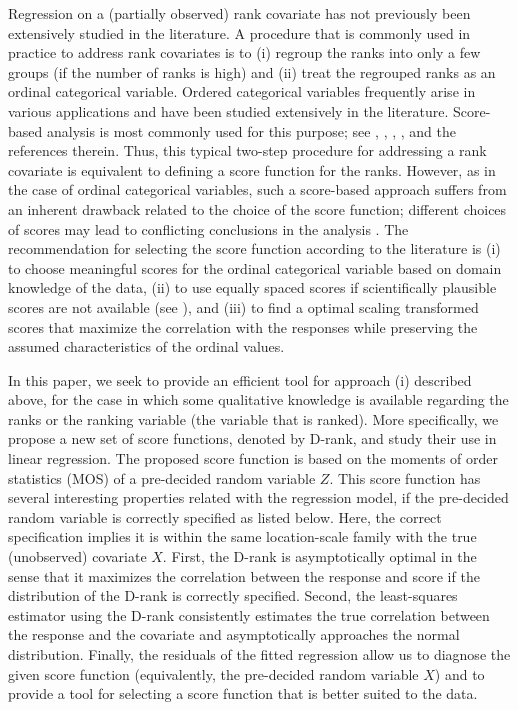 \documentclass[12pt]{article}
\begin{document}
Regression on a (partially observed) rank covariate has not 
previously been extensively studied in the literature. A procedure 
that is commonly used in practice to address rank covariates is to (i) regroup the ranks into only a few groups 
(if the number of ranks is high) and (ii) treat the regrouped ranks as an ordinal categorical variable.
Ordered categorical variables frequently arise in various applications and have been 
studied extensively in the literature. Score-based analysis is most commonly used for this purpose;
see \cite{Hajek:1968}, \citet{Hora:1984}, \citet{Kimeldorf:1992},
\citet{Zheng:2008}, \citet{Gertheiss:2014} and the references therein. Thus, this typical two-step procedure for addressing a rank covariate is equivalent to defining a score function for the ranks. However, as in the case of ordinal categorical 
variables, such a score-based approach suffers from an inherent drawback related to the choice of the score function; 
different choices of scores may lead to conflicting conclusions in the analysis 
\citep{Graubard:1987,Ivanova:2001,Senn:2007}. The recommendation 
for selecting the score function according to the literature is (i) to choose meaningful scores for 
the ordinal categorical variable based on domain knowledge of the data, (ii) to 
use equally spaced scores if scientifically plausible scores are not available (see \citet{Graubard:1987}),
 and (iii) to find a optimal scaling transformed scores that maximize the correlation with 
 the responses while preserving the assumed characteristics of the ordinal values\citep{Linting:2007,Costantini:2010,
 deLeeuw:2009,Mair:2010,Jacoby:2016}.


In this paper, we seek to provide an efficient tool for approach (i) described above, for the case in which some qualitative 
knowledge is available regarding the ranks or the ranking variable (the variable that is ranked). More specifically,
we propose a new set of score functions, denoted by D-rank, and study their use in linear regression.  
The proposed score function is based on the moments of order statistics (MOS) of a pre-decided random variable
$Z$. This score function has several interesting properties related with the regression model, if 
the pre-decided random variable is correctly specified as listed below. Here, the correct specification implies 
it is within the same location-scale family with the true (unobserved) covariate $X$. 
First, the D-rank is asymptotically
optimal in the sense that it maximizes the correlation between the response and score if 
the distribution of the D-rank is correctly specified. Second, 
the least-squares estimator using the D-rank consistently estimates the true correlation between
the response and the covariate and asymptotically approaches the normal distribution. Finally,
the residuals of the fitted regression allow us to diagnose the given score function (equivalently,
the pre-decided random variable $X$) and to provide a tool for selecting a score function 
that is better suited to the data. 
\end{document}
